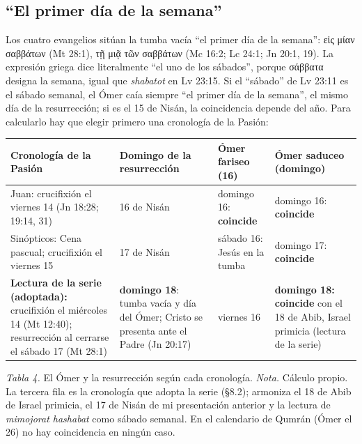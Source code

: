 \documentclass[11pt,letterpaper]{article}
\newcommand{\grc}[1]{\foreignlanguage{ancientgreek}{#1}}
\begin{document}
\subsection{``El primer día de la semana''}
Los cuatro evangelios sitúan la tumba vacía ``el primer día de la semana'': \grc{εἰς μίαν σαββάτων} (Mt 28:1), \grc{τῇ μιᾷ τῶν σαββάτων} (Mc 16:2; Lc 24:1; Jn 20:1, 19). La expresión griega dice literalmente ``el uno de los sábados'', porque \grc{σάββατα} designa la semana, igual que \emph{shabatot} en Lv 23:15. Si el ``sábado'' de Lv 23:11 es el sábado semanal, el Ómer caía siempre ``el primer día de la semana'', el mismo día de la resurrección; si es el 15 de Nisán, la coincidencia depende del año. Para calcularlo hay que elegir primero una cronología de la Pasión:

\begin{center}\begin{minipage}{\linewidth}\centering\footnotesize\renewcommand{\arraystretch}{1.15}
\begin{tabular}{@{}L{3.6cm}L{3.3cm}L{3.5cm}L{3.9cm}@{}}
\toprule
\textbf{Cronología de la Pasión} & \textbf{Domingo de la resurrección} & \textbf{Ómer fariseo (16)} & \textbf{Ómer saduceo (domingo)} \\ \midrule
Juan: crucifixión el viernes 14 (Jn 18:28; 19:14, 31) & 16 de Nisán & domingo 16: \textbf{coincide} & domingo 16: \textbf{coincide} \\
Sinópticos: Cena pascual; crucifixión el viernes 15 & 17 de Nisán & sábado 16: Jesús en la tumba & domingo 17: \textbf{coincide} \\
\textbf{\color{tierraroja}Lectura de la serie (adoptada):} crucifixión el miércoles 14 (Mt 12:40); resurrección al cerrarse el sábado 17 (Mt 28:1) & \textbf{domingo 18}: tumba vacía y día del Ómer; Cristo se presenta ante el Padre (Jn 20:17) & viernes 16 & \textbf{domingo 18: coincide} con el 18 de Abib, Israel primicia (lectura de la serie) \\
\bottomrule
\end{tabular}\par
{\footnotesize\color{sepia}\textit{Tabla 4.} El Ómer y la resurrección según cada cronología. \textit{Nota.} Cálculo propio. La tercera fila es la cronología que adopta la serie (§8.2); armoniza el 18 de Abib de Israel primicia, el 17 de Nisán de mi presentación anterior y la lectura de \emph{mimojorat hashabat} como sábado semanal. En el calendario de Qumrán (Ómer el 26) no hay coincidencia en ningún caso.}
\end{minipage}\end{center}
\end{document}
